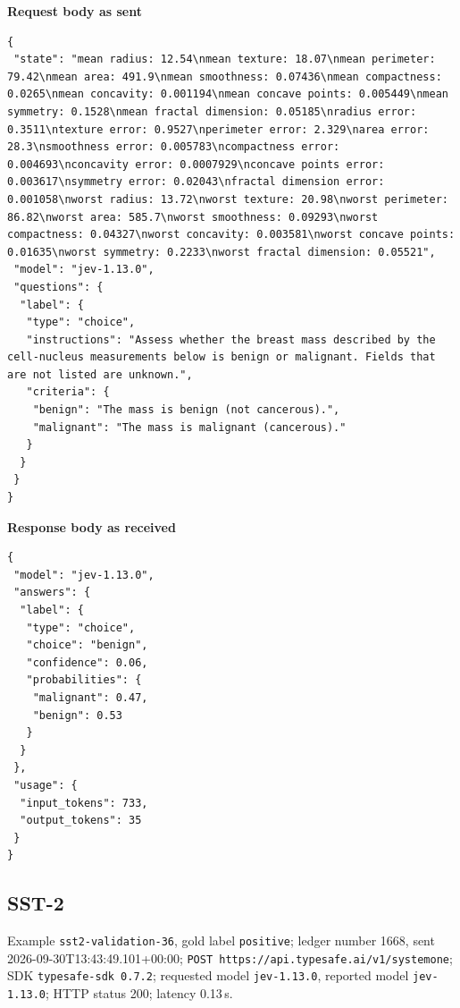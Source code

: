 \noindent\textbf{Request body as sent}
\begin{lstlisting}
{
 "state": "mean radius: 12.54\nmean texture: 18.07\nmean perimeter: 79.42\nmean area: 491.9\nmean smoothness: 0.07436\nmean compactness: 0.0265\nmean concavity: 0.001194\nmean concave points: 0.005449\nmean symmetry: 0.1528\nmean fractal dimension: 0.05185\nradius error: 0.3511\ntexture error: 0.9527\nperimeter error: 2.329\narea error: 28.3\nsmoothness error: 0.005783\ncompactness error: 0.004693\nconcavity error: 0.0007929\nconcave points error: 0.003617\nsymmetry error: 0.02043\nfractal dimension error: 0.001058\nworst radius: 13.72\nworst texture: 20.98\nworst perimeter: 86.82\nworst area: 585.7\nworst smoothness: 0.09293\nworst compactness: 0.04327\nworst concavity: 0.003581\nworst concave points: 0.01635\nworst symmetry: 0.2233\nworst fractal dimension: 0.05521",
 "model": "jev-1.13.0",
 "questions": {
  "label": {
   "type": "choice",
   "instructions": "Assess whether the breast mass described by the cell-nucleus measurements below is benign or malignant. Fields that are not listed are unknown.",
   "criteria": {
    "benign": "The mass is benign (not cancerous).",
    "malignant": "The mass is malignant (cancerous)."
   }
  }
 }
}
\end{lstlisting}
\noindent\textbf{Response body as received}
\begin{lstlisting}
{
 "model": "jev-1.13.0",
 "answers": {
  "label": {
   "type": "choice",
   "choice": "benign",
   "confidence": 0.06,
   "probabilities": {
    "malignant": 0.47,
    "benign": 0.53
   }
  }
 },
 "usage": {
  "input_tokens": 733,
  "output_tokens": 35
 }
}
\end{lstlisting}

\subsection*{SST-2}
Example \texttt{sst2-validation-36}, gold label \texttt{positive}; ledger number 1668, sent 2026-09-30T13:\allowbreak{}43:\allowbreak{}49.101+00:\allowbreak{}00; \texttt{POST https://api.typesafe.ai/\allowbreak{}v1/\allowbreak{}systemone}; SDK \texttt{typesafe-sdk 0.7.2}; requested model \texttt{jev-1.13.0}, reported model \texttt{jev-1.13.0}; HTTP status 200; latency 0.13\,s.

